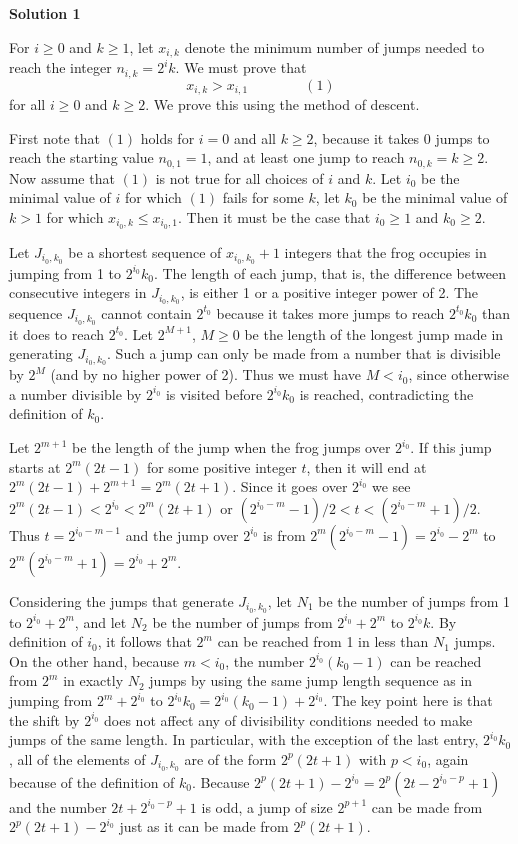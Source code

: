 \begin{enumerate}
 



\textbf{Solution 1}

For $i\geq 0$ and $k\geq 1$, let $x_{i,k}$ denote the minimum number of jumps needed to reach the integer $n_{i,k} = 2^i k$. We must prove that
 \[x_{i,k} > x_{i,1}\qquad\qquad (1)\]for all $i\geq 0$ and $k\geq 2$. We prove this using the method of descent.

 First note that $(1)$ holds for $i = 0$ and all $k\geq 2$, because it takes 0 jumps to reach the starting value $n_{0,1} = 1$, and at least one jump to reach $n_{0,k} = k\geq 2$. Now assume that $(1)$ is not true for all choices of $i$ and $k$. Let $i_0$ be the minimal value of $i$ for which $(1)$ fails for some $k$, let $k_0$ be the minimal value of $k > 1$ for which $x_{i_0,k}\leq x_{i_0,1}$. Then it must be the case that $i_0\geq 1$ and $k_0\geq 2$.

 Let $J_{i_0,k_0}$ be a shortest sequence of $x_{i_0,k_0} + 1$ integers that the frog occupies in jumping from 1 to $2^{i_0} k_0$. The length of each jump, that is, the difference between consecutive integers in $J_{i_0,k_0}$, is either 1 or a positive integer power of 2. The sequence $J_{i_0,k_0}$ cannot contain $2^{t_0}$ because it takes more jumps to reach $2^{t_0} k_0$ than it does to reach $2^{t_0}$. Let $2^{M+1}$, $M\geq 0$ be the length of the longest jump made in generating $J_{i_0,k_0}$. Such a jump can only be made from a number that is divisible by $2^M$ (and by no higher power of 2). Thus we must have $M < i_0$, since otherwise a number divisible by $2^{i_0}$ is visited before $2^{i_0} k_0$ is reached, contradicting the definition of $k_0$.

 Let $2^{m+1}$ be the length of the jump when the frog jumps over $2^{i_0}$. If this jump starts at $2^m(2t - 1)$ for some positive integer $t$, then it will end at $2^m(2t - 1) + 2^{m+1} = 2^m(2t + 1)$. Since it goes over $2^{i_0}$ we see $2^m(2t - 1) < 2^{i_0} < 2^m(2t + 1)$ or $(2^{i_0-m} - 1)/2 < t < (2^{i_0-m} + 1)/2$. Thus $t = 2^{i_0-m-1}$ and the jump over $2^{i_0}$ is from $2^m(2^{i_0-m} - 1) = 2^{i_0} - 2^m$ to $2^m(2^{i_0-m}+1) = 2^{i_0} + 2^m$.

 Considering the jumps that generate $J_{i_0,k_0}$, let $N_1$ be the number of jumps from 1 to $2^{i_0} + 2^m$, and let $N_2$ be the number of jumps from $2^{i_0} + 2^m$ to $2^{i_0}k$. By definition of $i_0$, it follows that $2^m$ can be reached from 1 in less than $N_1$ jumps. On the other hand, because $m < i_0$, the number $2^{i_0}(k_0 - 1)$ can be reached from $2^m$ in exactly $N_2$ jumps by using the same jump length sequence as in jumping from $2^m + 2^{i_0}$ to $2^{i_0} k_0 = 2^{i_0}(k_0 - 1) + 2^{i_0}$. The key point here is that the shift by $2^{i_0}$ does not affect any of divisibility conditions needed to make jumps of the same length. In particular, with the exception of the last entry, $2^{i_0} k_0$, all of the elements of $J_{i_0,k_0}$ are of the form $2^p(2t + 1)$ with $p < i_0$, again because of the definition of $k_0$. Because $2^p(2t + 1) - 2^{i_0} = 2^p(2t - 2^{i_0-p} + 1)$ and the number $2t + 2^{i_0-p} + 1$ is odd, a jump of size $2^{p+1}$ can be made from $2^p(2t + 1) - 2^{i_0}$ just as it can be made from $2^p(2t + 1)$.


\end{enumerate}
